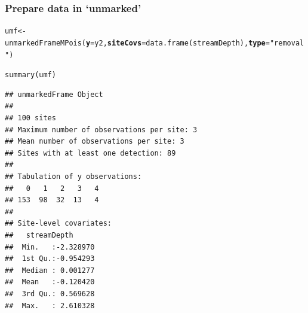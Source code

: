 \documentclass[color=usenames,dvipsnames]{beamer}\usepackage[]{graphicx}\usepackage[]{xcolor}
\makeatletter
\newcommand{\hlsng}[1]{\textcolor[rgb]{0.749,0.012,0.012}{#1}}%
\newcommand{\hldef}[1]{\textcolor[rgb]{0,0,0}{#1}}%
\newcommand{\hlkwb}[1]{\textcolor[rgb]{0,0.341,0.682}{#1}}%
\newcommand{\hlkwc}[1]{\textcolor[rgb]{0,0,0}{\textbf{#1}}}%
\newcommand{\hlkwd}[1]{\textcolor[rgb]{0.004,0.004,0.506}{#1}}%
\newenvironment{kframe}{%
 \def\at@end@of@kframe{}%
 \ifinner\ifhmode%
  \def\at@end@of@kframe{\end{minipage}}%
  \begin{minipage}{\columnwidth}%
 \fi\fi%
 \def\FrameCommand##1{\hskip\@totalleftmargin \hskip-\fboxsep
 \colorbox{shadecolor}{##1}\hskip-\fboxsep
     \hskip-\linewidth \hskip-\@totalleftmargin \hskip\columnwidth}%
 \MakeFramed {\advance\hsize-\width
   \@totalleftmargin\z@ \linewidth\hsize
   \@setminipage}}%
 {\par\unskip\endMakeFramed%
 \at@end@of@kframe}
\newenvironment{knitrout}{}{} %
\makeatother
\begin{document}









\begin{frame}[fragile]
  \frametitle{Prepare data in `unmarked'}
  \small
\begin{knitrout}\tiny
{}\color{fgcolor}\begin{kframe}
\begin{alltt}
\hldef{umf} \hlkwb{<-} \hlkwd{unmarkedFrameMPois}\hldef{(}\hlkwc{y}\hldef{=y2,} \hlkwc{siteCovs}\hldef{=}\hlkwd{data.frame}\hldef{(streamDepth),} \hlkwc{type}\hldef{=}\hlsng{"removal"}\hldef{)}
\end{alltt}
\end{kframe}
\end{knitrout}
\pause
\begin{knitrout}\scriptsize
{}\color{fgcolor}\begin{kframe}
\begin{alltt}
\hlkwd{summary}\hldef{(umf)}
\end{alltt}
\begin{verbatim}
## unmarkedFrame Object
## 
## 100 sites
## Maximum number of observations per site: 3 
## Mean number of observations per site: 3 
## Sites with at least one detection: 89 
## 
## Tabulation of y observations:
##   0   1   2   3   4 
## 153  98  32  13   4 
## 
## Site-level covariates:
##   streamDepth       
##  Min.   :-2.328970  
##  1st Qu.:-0.954293  
##  Median : 0.001277  
##  Mean   :-0.120420  
##  3rd Qu.: 0.569628  
##  Max.   : 2.610328
\end{verbatim}
\end{kframe}
\end{knitrout}
\end{frame}



\end{document}

